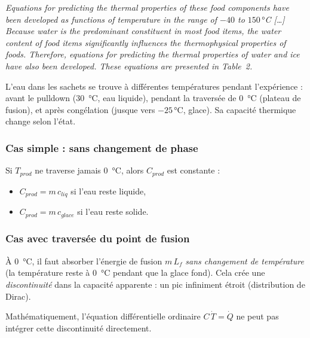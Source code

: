 \documentclass[11pt,a4paper]{article}
\begin{document}
\begin{tcolorbox}[breakable,enhanced jigsaw,colback=yellow!10,colframe=yellow!50!black,boxrule=0.4pt,arc=2pt,
title=\textbf{Extrait textuel — ScienceDirect Topics, \emph{Thermal Property of Food}}]
\og{} \emph{Equations for predicting the thermal properties of these food components have
been developed as functions of temperature in the range of $-40$ to $150\,°$C [\dots]
Because water is the predominant constituent in most food items, the water content of food
items significantly influences the thermophysical properties of foods. Therefore, equations
for predicting the thermal properties of water and ice have also been developed. These
equations are presented in Table~2.} \fg{}
\end{tcolorbox}

L'eau dans les sachets se trouve à différentes températures pendant l'expérience : avant
le pulldown (\SI{30}{\celsius}, eau liquide), pendant la traversée de \SI{0}{\celsius}
(plateau de fusion), et après congélation (jusque vers $-25\,\si{\celsius}$, glace).
Sa capacité thermique change selon l'état.

\subsubsection{Cas simple : sans changement de phase}

Si $T_{prod}$ ne traverse jamais \SI{0}{\celsius}, alors $C_{prod}$ est constante :
\begin{itemize}[itemsep=0pt]
\item $C_{prod} = m\,c_{liq}$ si l'eau reste liquide,
\item $C_{prod} = m\,c_{glace}$ si l'eau reste solide.
\end{itemize}

\subsubsection{Cas avec traversée du point de fusion}

À \SI{0}{\celsius}, il faut absorber l'énergie de fusion $m\,L_f$ \emph{sans changement de
température} (la température reste à \SI{0}{\celsius} pendant que la glace fond). Cela crée
une \emph{discontinuité} dans la capacité apparente : un pic infiniment étroit (distribution
de Dirac).

Mathématiquement, l'équation différentielle ordinaire $C\,\dot T = \dot Q$ ne peut pas
intégrer cette discontinuité directement.
\end{document}
